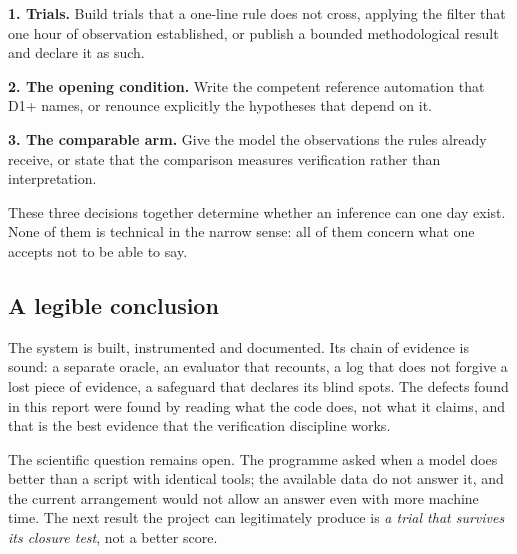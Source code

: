 \textbf{1. Trials.} Build trials that a one-line rule does not cross, applying the
filter that one hour of observation established, or publish a bounded
methodological result and declare it as such.

\textbf{2. The opening condition.} Write the competent reference automation that
D1+ names, or renounce explicitly the hypotheses that depend on it.

\textbf{3. The comparable arm.} Give the model the observations the rules already
receive, or state that the comparison measures verification rather than
interpretation.

These three decisions together determine whether an inference can one day exist.
None of them is technical in the narrow sense: all of them concern what one
accepts not to be able to say.

\subsection{A legible conclusion}

The system is built, instrumented and documented. Its chain of evidence is sound:
a separate oracle, an evaluator that recounts, a log that does not forgive a lost
piece of evidence, a safeguard that declares its blind spots. The defects found in
this report were found by reading what the code does, not what it claims, and that
is the best evidence that the verification discipline works.

The scientific question remains open. The programme asked when a model does better
than a script with identical tools; the available data do not answer it, and the
current arrangement would not allow an answer even with more machine time. The
next result the project can legitimately produce is \emph{a trial that survives its
closure test}, not a better score.
